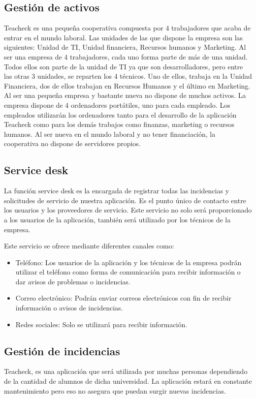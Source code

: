 \subsection{Gestión de activos}
Teacheck es una pequeña cooperativa compuesta por 4 trabajadores que acaba de entrar en el mundo laboral. Las unidades de las que dispone la empresa son las siguientes: Unidad de TI, Unidad financiera, Recursos humanos y Marketing. Al ser una empresa de 4 trabajadores, cada uno forma parte de más de una unidad. Todos ellos son parte de la unidad de TI ya que son desarrolladores, pero entre las otras 3 unidades, se reparten los 4 técnicos. Uno de ellos, trabaja en la Unidad Financiera, dos de ellos trabajan en Recursos Humanos y el último en Marketing.
Al ser una pequeña empresa y bastante nueva no dispone de muchos activos.
La empresa dispone de 4 ordenadores portátiles, uno para cada empleado. Los empleados utilizarán los ordenadores tanto para el desarrollo de la aplicación Teacheck como para los demás trabajos como finanzas, marketing o recursos humanos. Al ser nueva en el mundo laboral y no tener financiación, la cooperativa no dispone de servidores propios.
\subsection{Service desk}
La función service desk es la encargada de registrar todas las incidencias y solicitudes de servicio de nuestra aplicación. Es el punto único de contacto entre los usuarios y los proveedores de servicio. Este servicio no solo será proporcionado a los usuarios de la aplicación, también será utilizado por los técnicos de la empresa.

Este servicio se ofrece mediante diferentes canales como:
\begin{itemize}
\item{Teléfono: }Los usuarios de la aplicación y los técnicos de la empresa podrán utilizar el teléfono como forma de comunicación para recibir información o dar avisos de problemas o incidencias. 
\item{Correo electrónico: }Podrán enviar correos electrónicos con fin de recibir información o avisos de incidencias.
\item{Redes sociales: }Solo se utilizará para recibir información.
\end{itemize}
\subsection{Gestión de incidencias}
Teacheck, es una aplicación que será utilizada por muchas personas dependiendo de la cantidad de alumnos de dicha universidad. La aplicación estará en constante mantenimiento pero eso no asegura que puedan surgir nuevas incidencias. 

